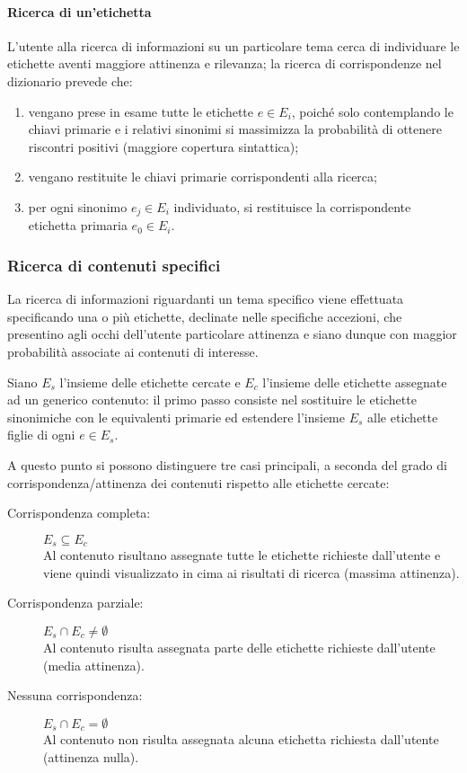 \documentclass[10pt,a4paper,headinclude,footinclude,hidelinks]{scrreprt} %
\begin{document}
	\paragraph{Ricerca di un'etichetta}
	L'utente alla ricerca di informazioni su un particolare tema cerca di individuare le etichette aventi maggiore attinenza e rilevanza; la ricerca di corrispondenze nel dizionario prevede che:
	\begin{enumerate}
	\item vengano prese in esame tutte le etichette $e \in E_i$, poiché solo contemplando le chiavi primarie e i relativi sinonimi si massimizza la probabilità di ottenere riscontri positivi (maggiore copertura sintattica);
	\item vengano restituite le chiavi primarie corrispondenti alla ricerca;
	\item per ogni sinonimo $e_j \in E_i$ individuato, si restituisce la corrispondente etichetta primaria $e_0 \in E_i$.
	\end{enumerate}

	\subsubsection{Ricerca di contenuti specifici}
	La ricerca di informazioni riguardanti un tema specifico viene effettuata specificando una o più etichette, declinate nelle specifiche accezioni, che presentino agli occhi dell'utente particolare attinenza e siano dunque con maggior probabilità associate ai contenuti di interesse.

	Siano $E_s$ l'insieme delle etichette cercate e $E_c$ l'insieme delle etichette assegnate ad un generico contenuto: il primo passo consiste nel sostituire le etichette sinonimiche con le equivalenti primarie ed estendere l'insieme $E_s$ alle etichette figlie di ogni $e \in E_s$.

	A questo punto si possono distinguere tre casi principali, a seconda del grado di corrispondenza/attinenza dei contenuti rispetto alle etichette cercate:
	\begin{description}
	\item[Corrispondenza completa:] $E_s \subseteq E_c$ \hfill \\
	Al contenuto risultano assegnate tutte le etichette richieste dall'utente e viene quindi visualizzato in cima ai risultati di ricerca (massima attinenza).
 	\item[Corrispondenza parziale:] $E_s \cap E_c \neq \emptyset$ \hfill \\
	Al contenuto risulta assegnata parte delle etichette richieste dall'utente (media attinenza).
	\item[Nessuna corrispondenza:] $E_s \cap E_c = \emptyset$\hfill \\
	Al contenuto non risulta assegnata alcuna etichetta richiesta dall'utente (attinenza nulla).
	\end{description}
\end{document}
